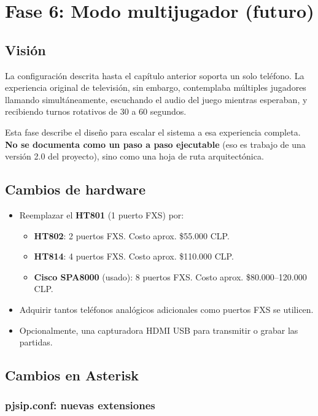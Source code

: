 \chapter{Fase 6: Modo multijugador (futuro)}

\section{Visión}

La configuración descrita hasta el capítulo anterior soporta un solo teléfono. La experiencia original de televisión, sin embargo, contemplaba múltiples jugadores llamando simultáneamente, escuchando el audio del juego mientras esperaban, y recibiendo turnos rotativos de 30 a 60 segundos.

Esta fase describe el diseño para escalar el sistema a esa experiencia completa. \textbf{No se documenta como un paso a paso ejecutable} (eso es trabajo de una versión 2.0 del proyecto), sino como una hoja de ruta arquitectónica.

\section{Cambios de hardware}

\begin{itemize}
  \item Reemplazar el \textbf{HT801} (1 puerto FXS) por:
    \begin{itemize}
      \item \textbf{HT802}: 2 puertos FXS. Costo aprox. \$55.000 CLP.
      \item \textbf{HT814}: 4 puertos FXS. Costo aprox. \$110.000 CLP.
      \item \textbf{Cisco SPA8000} (usado): 8 puertos FXS. Costo aprox. \$80.000--120.000 CLP.
    \end{itemize}
  \item Adquirir tantos teléfonos analógicos adicionales como puertos FXS se utilicen.
  \item Opcionalmente, una capturadora HDMI USB para transmitir o grabar las partidas.
\end{itemize}

\section{Cambios en Asterisk}

\subsection{pjsip.conf: nuevas extensiones}

